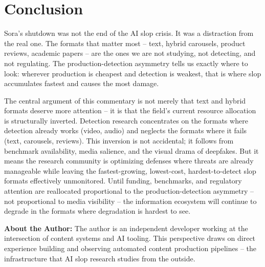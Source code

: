 \documentclass[12pt]{article}
\begin{document}
\section{Conclusion}

Sora's shutdown was not the end of the AI slop crisis. It was a distraction from the real one. The formats that matter most -- text, hybrid carousels, product reviews, academic papers -- are the ones we are not studying, not detecting, and not regulating. The production-detection asymmetry tells us exactly where to look: wherever production is cheapest and detection is weakest, that is where slop accumulates fastest and causes the most damage.

The central argument of this commentary is not merely that text and hybrid formats deserve more attention -- it is that the field's current resource allocation is structurally inverted. Detection research concentrates on the formats where detection already works (video, audio) and neglects the formats where it fails (text, carousels, reviews). This inversion is not accidental; it follows from benchmark availability, media salience, and the visual drama of deepfakes. But it means the research community is optimizing defenses where threats are already manageable while leaving the fastest-growing, lowest-cost, hardest-to-detect slop formats effectively unmonitored. Until funding, benchmarks, and regulatory attention are reallocated proportional to the production-detection asymmetry -- not proportional to media visibility -- the information ecosystem will continue to degrade in the formats where degradation is hardest to see.

\vspace{1em}
\noindent\textbf{About the Author:} The author is an independent developer working at the intersection of content systems and AI tooling. This perspective draws on direct experience building and observing automated content production pipelines -- the infrastructure that AI slop research studies from the outside.
\end{document}
